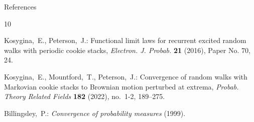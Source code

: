 \begin{mainbox}{References}
\begin{thebibliography}{10}
        
        Kosygina,~E., Peterson,~J.: Functional limit laws for recurrent excited random walks with periodic cookie stacks, \emph{Electron. J. Probab.} \textbf{21} (2016), Paper No. 70, 24. 

                
        Kosygina,~E., Mountford,~T., Peterson,~J.: Convergence of random walks with {M}arkovian cookie stacks to {B}rownian motion perturbed at extrema, \emph{Probab. Theory Related Fields} \textbf{182} (2022), no.~1-2, 189--275. 
        


        
      
        Billingsley,~P.: \emph{Convergence of probability measures} (1999).
        


        
        \end{thebibliography}
        \endgroup
\end{mainbox}